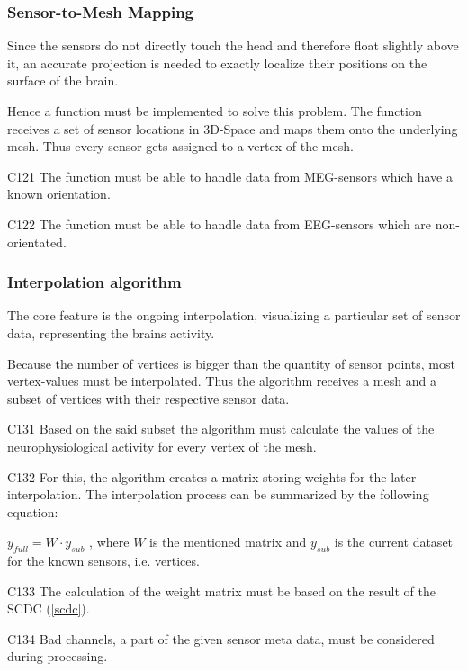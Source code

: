 \subsubsection{Sensor-to-Mesh Mapping} \label{projection}

	Since the sensors do not directly touch the head and therefore float slightly above it, an accurate projection is needed to 
	exactly localize their positions on the surface of the brain. 
	
	Hence a function must be implemented to solve this problem. 
	The function receives a set of sensor locations in 3D-Space and maps them onto the underlying mesh. Thus every 			sensor gets assigned to a vertex of the mesh. 

	\begin{aims}
	
		\item[C121] The function must be able to handle data from MEG-sensors which have a known orientation.
		\item[C122] The function must be able to handle data from EEG-sensors which are non-orientated.
	
	\end{aims}

\subsubsection{Interpolation algorithm} \label{interpolation} 

	The core feature is the ongoing interpolation, visualizing a particular set of sensor data, representing the brains 			activity.
	
	Because the number of vertices is bigger than the quantity of sensor points, most vertex-values must be interpolated.
	Thus the algorithm receives a mesh and a subset of vertices with their respective sensor data.  
	
	\begin{aims}
	
		\item[C131] Based on the said subset the algorithm must calculate the values of the neurophysiological activity for every vertex of the mesh.
		\item[C132] For this, the algorithm creates a matrix storing weights for the later interpolation.
					The interpolation process can be summarized by the following equation: 
					
					$y_{full} = W \cdot y_{sub}$
					, where $W$ is the mentioned matrix and $y_{sub}$ is the current dataset for the known sensors, i.e. 							vertices.
		\item[C133] The calculation of the weight matrix must be based on the result of the SCDC (\ref{scdc}).
		\item[C134] Bad channels, a part of the given sensor meta data, must be considered during processing. 
	
	\end{aims}

